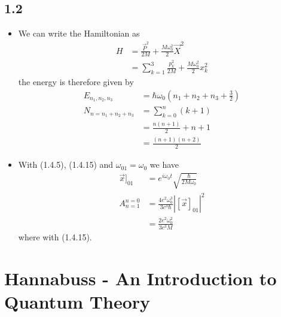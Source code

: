 \documentclass[../main.tex]{subfiles}
\begin{document}
\subsection{1.2}
\begin{itemize}
\item We can write the Hamiltonian as
\begin{align}
    H&=\frac{\vec{P}^2}{2M}+\frac{M\omega_0^2}{2}\vec{X}^2\\
    &=\sum_{k=1}^3\frac{p_k^2}{2M}+\frac{M\omega_0^2}{2}x_k^2
\end{align}
the energy is therefore given by
\begin{align}
    E_{n_1,n_2,n_3}&=\hbar\omega_0\left(n_1+n_2+n_3+\frac{3}{2}\right)\\
    N_{n=n_1+n_2+n_3}&=\sum_{k=0}^{n}(k+1)\\
    &=\frac{n(n+1)}{2}+n+1\\
    &=\frac{(n+1)(n+2)}{2}
\end{align}

\item With (1.4.5), (1.4.15) and $\omega_{01}=\omega_0$ we have
\begin{align}
    \vec{x}]_{01}&=e^{i\omega_0 t}\sqrt{\frac{\hbar}{2M\omega_0}}\\
    A_{n=1}^{n=0}&=\frac{4e^2\omega_0^3}{3c^3\hbar}\left|[\vec{x}]_{01}\right|^2\\
    &=\frac{2e^2\omega_0^2}{3c^3M}
\end{align}
where with (1.4.15).
\end{itemize}

\section{{\sc Hannabuss} - An Introduction to Quantum Theory}
\end{document}
